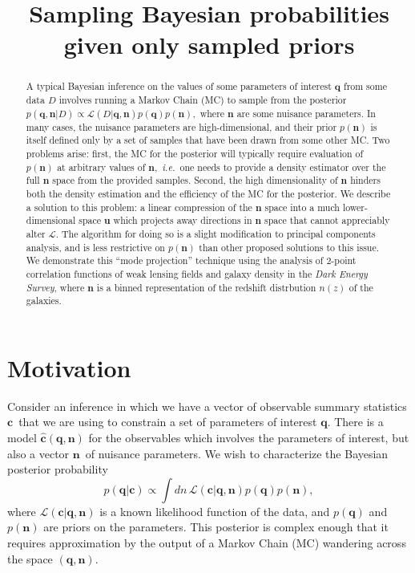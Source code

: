 \documentclass[linenumbers, onecolumn]{aastex7}
\newcommand{\ie}{\textit{i.e.}}
\newcommand{\vecc}{\ensuremath{\mathbf{c}}}
\newcommand{\vecq}{\ensuremath{\mathbf{q}}}
\newcommand{\vecn}{\ensuremath{\mathbf{n}}}
\newcommand{\vecu}{\ensuremath{\mathbf{u}}}
\newcommand{\hatc}{\ensuremath{\hat{\mathbf{c}}}}
\newcommand{\likeli}{\mathcal{L}}
\begin{document}
\title{Sampling Bayesian probabilities given only sampled priors}




\begin{abstract}
	\vspace{0.2in}
A typical Bayesian inference on the values of some parameters of
interest $\vecq$ from some data $D$ involves running a Markov Chain (MC) to sample
from the posterior $p(\vecq,\vecn | D) \propto \likeli(D | \vecq,\vecn)
p(\vecq) p(\vecn),$ where $\vecn$ are some nuisance parameters.  In
many cases, the nuisance parameters are high-dimensional, and their
prior $p(\vecn)$ is itself defined only by a set of samples that have
been drawn from some other MC.  Two problems arise: first,
the MC for the posterior will typically require evaluation of
$p(\vecn)$ at arbitrary values of $\vecn,$ \ie\ one needs to provide a
density estimator over the full $\vecn$ space from the provided
samples.  Second, the high dimensionality of $\vecn$ hinders both the
density estimation and the efficiency of the MC for the posterior.  We
describe a solution to this problem: a linear compression of the
$\vecn$ space into a much lower-dimensional space $\vecu$ which
projects away directions in $\vecn$ space that cannot appreciably
alter $\likeli.$ The algorithm for doing so is a slight modification
to principal components analysis, and is less restrictive on
$p(\vecn)$ than other proposed solutions to this issue.
We demonstrate this ``mode projection'' technique using the analysis
of 2-point correlation functions of weak lensing fields and galaxy
density in the \textit{Dark Energy Survey}, where $\vecn$ is a binned representation of the redshift distrbution
$n(z)$ of the galaxies.
\end{abstract}

\section{Motivation} \label{sec:intro}

Consider an inference in which we have a vector of observable summary
statistics \vecc\ that we are using to constrain a set of parameters of
interest \vecq.  There is a model $\hatc(\vecq,\vecn)$ for the
observables which involves the parameters of interest, but also a
vector \vecn\ of nuisance parameters.  
We wish to characterize the Bayesian posterior probability
\begin{equation}
  p(\vecq | \vecc) \propto \int dn\, \likeli(\vecc | \vecq, \vecn) p(\vecq) p(\vecn),
\label{eq:posterior}
\end{equation}
where $\likeli(\vecc | \vecq, \vecn)$ is a known likelihood function
of the data, and $p(\vecq)$ and $p(\vecn)$ are priors on the
parameters.  This posterior is complex enough that it requires
approximation by the output of a Markov Chain (MC) wandering across the space $(\vecq,\vecn).$
\end{document}
